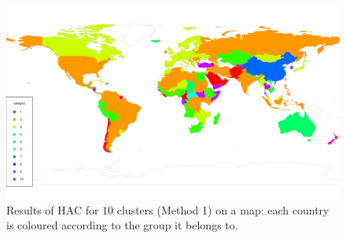 \documentclass[a4paper,12pt]{article}
\numberwithin{equation}{section}
\begin{document}





\newpage 
\FloatBarrier
\begin{figure}[t!]
\begin{minipage}[t]{0.98\textwidth}
\includegraphics[width=\textwidth]{plots/14days/map_10cl}
\caption{Results of HAC for $10$ clusters (Method 1) on a map: each country is coloured according to the group it belongs to.}\label{fig:map_10cl}
\end{minipage}
\end{figure}
\end{document}
